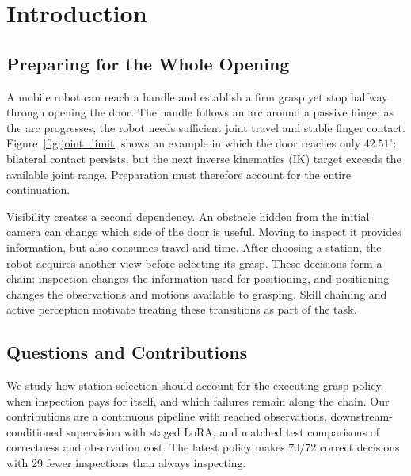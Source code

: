 \section{Introduction}
\label{sec:introduction}
\subsection{Preparing for the Whole Opening}
A mobile robot can reach a handle and establish a firm grasp yet stop halfway
through opening the door. The handle follows an arc around a passive hinge;
as the arc progresses, the robot needs sufficient joint travel and stable
finger contact. Figure~\ref{fig:joint_limit} shows an example in which the door
reaches only $42.51^\circ$: bilateral contact persists, but the next inverse
kinematics (IK) target exceeds the available joint range. Preparation must
therefore account for the entire continuation.

Visibility creates a second dependency. An obstacle hidden from the initial
camera can change which side of the door is useful. Moving to inspect it
provides information, but also consumes travel and time. After choosing a
station, the robot acquires another view before selecting its grasp. These
decisions form a chain: inspection changes the information used for positioning,
and positioning changes the observations and motions available to grasping.
Skill chaining \citep{chen2023sequential} and active perception
\citep{bajcsy1988active} motivate treating these transitions as part of the task.

\ifshowfigures

\fi

\subsection{Questions and Contributions}
We study how station selection should account for the executing grasp policy,
when inspection pays for itself, and which failures remain along the chain.
Our contributions are a continuous pipeline with reached observations,
downstream-conditioned supervision with staged LoRA, and matched test
comparisons of correctness and observation cost. The latest policy makes
$70/72$ correct decisions with 29 fewer inspections than always inspecting.
